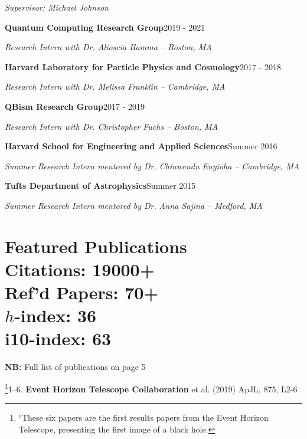 \documentclass[margin,line]{res}
\begin{document}
\begin{resume}
\begin{changemargin}{-0.0cm}{2.5cm}
\textit{Supervisor: Michael Johnson}
\end{changemargin}

{\bf Quantum Computing Research Group}\hfill 2019 - 2021

\vspace{-.4cm}
{\em Research Intern with Dr. Alioscia Hamma  -- Boston, MA}

\vspace{.1cm}
{\bf Harvard Laboratory for Particle Physics and Cosmology}\hfill 2017 - 2018

\vspace{-.4cm}
{\em Research Intern with Dr. Melissa Franklin -- Cambridge, MA}

% 
{\bf QBism Research Group}\hfill 2017 - 2019

\vspace{-.4cm}
{\em Research Intern with Dr. Christopher Fuchs  -- Boston, MA}

{\bf Harvard School for Engineering and Applied Sciences}\hfill Summer 2016

\vspace{-.4cm}
{\em Summer Research Intern mentored by Dr. Chinwendu Enyioha -- Cambridge, MA}

{\bf Tufts Department of Astrophysics}\hfill Summer 2015

\vspace{-.4cm}
{\em Summer Research Intern mentored by Dr. Anna Sajina -- Medford, MA}




\vspace{+.4cm}
\section{{\sc Featured Publications  \\ \vspace{0.3cm} {\footnotesize Citations: 19000+ \\ \vspace{0.1cm} \noindent Ref'd Papers: 70+ \vspace{0.1cm} \\ $h$-index: 36 \\ i10-index: 63}} \\ }

\textbf{NB:} Full list of publications on page 5


\footnote[$\dagger$]{\noindent $^\dagger$These six papers are the first results papers from the Event Horizon Telescope, presenting the first image of a black hole.}1--6. \textbf{Event Horizon Telescope Collaboration} et al. (2019) ApJL, 875, L2-6




\end{resume}
\end{document}
